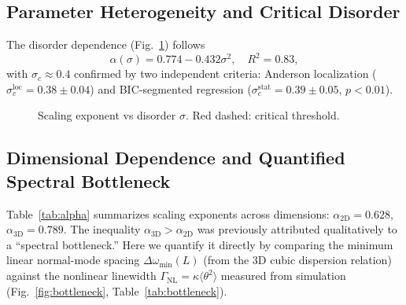 \documentclass[aps,pre,12pt]{revtex4-2}
\begin{document}
\subsection{Parameter Heterogeneity and Critical Disorder}

The disorder dependence (Fig.~\ref{fig:disorder}) follows
\begin{equation}
    \alpha(\sigma)=0.774-0.432\sigma^2,\quad R^2=0.83,
\end{equation}
with $\sigma_c\approx0.4$ confirmed by two independent criteria: Anderson localization ($\sigma_c^{\text{loc}}=0.38\pm0.04$) and BIC-segmented regression ($\sigma_c^{\text{stat}}=0.39\pm0.05$, $p<0.01$).

\begin{figure}[htbp]
\centering
{}
\caption{Scaling exponent vs disorder $\sigma$. Red dashed: critical threshold.}
\label{fig:disorder}
\end{figure}

\subsection{Dimensional Dependence and Quantified Spectral Bottleneck}

Table~\ref{tab:alpha} summarizes scaling exponents across dimensions: $\alpha_{2\text{D}}=0.628$, $\alpha_{3\text{D}}=0.789$. The inequality $\alpha_{3\text{D}}>\alpha_{2\text{D}}$ was previously attributed qualitatively to a ``spectral bottleneck.'' Here we quantify it directly by comparing the minimum linear normal-mode spacing $\Delta\omega_{\min}(L)$ (from the 3D cubic dispersion relation) against the nonlinear linewidth $\Gamma_{\text{NL}}=\kappa\langle\theta^2\rangle$ measured from simulation (Fig.~\ref{fig:bottleneck}, Table~\ref{tab:bottleneck}).
\end{document}
